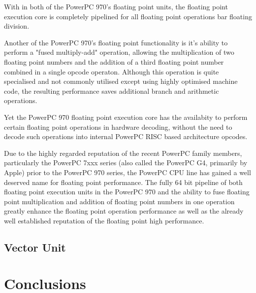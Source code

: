 \documentclass[a4paper,12pt]{article}
\begin{document}
With \cite[80 registers, (32 PowerPC architectural registers and 48
rename registers)]{a2} in both of the PowerPC 970's floating point units, the
floating point execution core is completely pipelined for all floating
point operations bar floating division. 


Another \cite[well renoweded feature]{a5} of the PowerPC 970's floating
point functionality is it's ability to perform a "fused multiply-add"
operation, allowing the multiplication of two floating point numbers and
the addition of a third floating point number combined in a single
opcode operaton. Although this operation is quite specialised and not
commonly utilised except using highly optimised machine code, the resulting
performance saves additional branch and arithmetic operations. 


Yet \cite[another key feature]{a2} the PowerPC 970 floating point execution core 
has the availabity to perform certain floating point operations in
hardware decoding, without the need to decode such operations into
internal PowerPC RISC based architecture opcodes.


Due to the highly regarded reputation of the recent PowerPC family
members, particularly the PowerPC 7xxx series (also called the PowerPC
G4, primarily by Apple) prior to the PowerPC 970 series, the PowerPC 
CPU line has gained a well deserved name 
for floating point performance. The fully 64 bit pipeline of both 
floating point execution units in the PowerPC 970 and the ability to fuse 
floating point multiplication and addition of floating point numbers in 
one operation greatly enhance the floating point operation performance as 
well as the already well established reputation of the floating point high 
performance. 

\subsection{Vector Unit}



\section{Conclusions}




\end{document}
